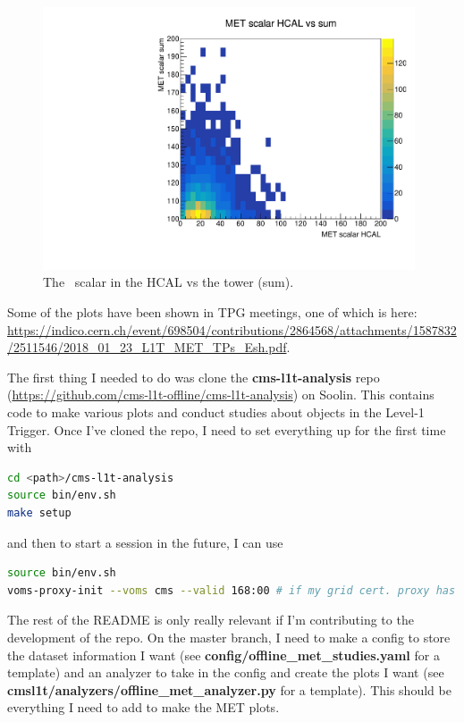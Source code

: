 \begin{figure}[H]
\centering
\includegraphics[width=110mm]{./sec34/MET_studies_v6/Plots/MetScalHcaltotal.pdf}
\caption{The \etmiss\ scalar in the HCAL vs the tower (sum).}
\end{figure}

Some of the plots have been shown in TPG meetings, one of which is here: \url{https://indico.cern.ch/event/698504/contributions/2864568/attachments/1587832/2511546/2018_01_23_L1T_MET_TPs_Esh.pdf}.



\if
The first thing I needed to do was clone the \textbf{cms-l1t-analysis} repo (\url{https://github.com/cms-l1t-offline/cms-l1t-analysis}) on Soolin. This contains code to make various plots and conduct studies about objects in the Level-1 Trigger. Once I've cloned the repo, I need to set everything up for the first time with

\begin{lstlisting}[belowskip=-0.7cm, language=sh, numbers=none]
cd <path>/cms-l1t-analysis
source bin/env.sh
make setup
\end{lstlisting}

and then to start a session in the future, I can use

\begin{lstlisting}[belowskip=-0.7cm, language=sh, numbers=none]
source bin/env.sh
voms-proxy-init --voms cms --valid 168:00 # if my grid cert. proxy has expired
\end{lstlisting}

The rest of the README is only really relevant if I'm contributing to the development of the repo. On the master branch, I need to make a config to store the dataset information I want (see \textbf{config/offline\_met\_studies.yaml} for a template) and an analyzer to take in the config and create the plots I want (see \textbf{cmsl1t/analyzers/offline\_met\_analyzer.py} for a template). This should be everything I need to add to make the MET plots.

